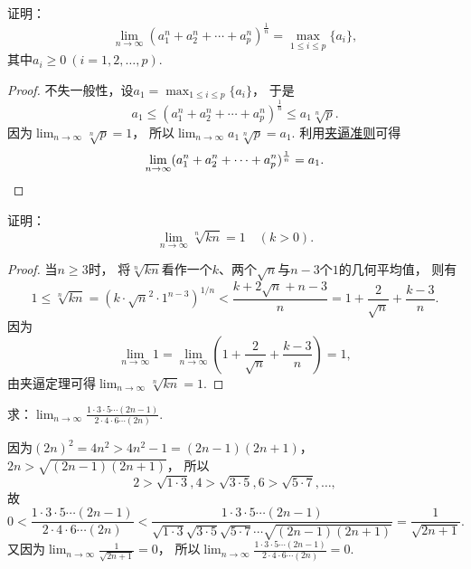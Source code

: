 \begin{example}
证明：\[
	\lim_{n\to\infty} (a_1^n + a_2^n + \dotsb + a_p^n)^{\frac1n}
	= \max_{1\leq i\leq p} \{a_i\},
\]
其中\(a_i\geq0\ (i=1,2,\dotsc,p)\).
\begin{proof}
不失一般性，设\(a_1 = \max_{1\leq i\leq p} \{a_i\}\)，
于是\[
	a_1 \leq (a_1^n + a_2^n + \dotsb + a_p^n)^{\frac1n} \leq a_1 \sqrt[n]{p}.
\]
因为\(\lim_{n\to\infty} \sqrt[n]{p} = 1\)，
所以\(\lim_{n\to\infty} a_1 \sqrt[n]{p} = a_1\).
利用\hyperref[theorem:数列极限.夹逼准则]{夹逼准则}可得\[
	\lim_{n\to\infty} (a_1^n + a_2^n + \dotsb + a_p^n)^{\frac1n} = a_1.
	\qedhere
\]
\end{proof}
\end{example}

\begin{example}
证明：\begin{equation}
	\lim_{n\to\infty} \sqrt[n]{k n} = 1
	\quad(k>0).
\end{equation}
\begin{proof}
当\(n \geq 3\)时，
将\(\sqrt[n]{k n}\)看作一个\(k\)、两个\(\sqrt{n}\)与\(n-3\)个\(1\)的几何平均值，
则有\[
	1 \leq \sqrt[n]{k n} = (k \cdot \sqrt{n}^2 \cdot 1^{n-3})^{1/n}
	< \frac{k + 2\sqrt{n} + n-3}{n}
	= 1 + \frac{2}{\sqrt{n}} + \frac{k-3}{n}.
\]
因为\[
	\lim_{n\to\infty} 1
	= \lim_{n\to\infty} \left(1 + \frac{2}{\sqrt{n}} + \frac{k-3}{n}\right) = 1,
\]
由夹逼定理可得\(\lim_{n\to\infty} \sqrt[n]{k n} = 1\).
\end{proof}
\end{example}

\begin{example}\label{example:极限.两个双阶乘的商的极限}
求：\(\lim_{n\to\infty} \frac{1 \cdot 3 \cdot 5 \dotsm (2n-1)}{2 \cdot 4 \cdot 6 \dotsm (2n)}\).
\begin{solution}
因为\((2n)^2 = 4n^2 > 4n^2-1 = (2n-1)(2n+1)\)，\(2n > \sqrt{(2n-1)(2n+1)}\)，
所以\[
	2 > \sqrt{1 \cdot 3},
	4 > \sqrt{3 \cdot 5},
	6 > \sqrt{5 \cdot 7},
	\dotsc,
\]
故\[
	0 < \frac{1 \cdot 3 \cdot 5 \dotsm (2n-1)}{2 \cdot 4 \cdot 6 \dotsm (2n)}
	< \frac{1 \cdot 3 \cdot 5 \dotsm (2n-1)}{\sqrt{1 \cdot 3} \sqrt{3 \cdot 5} \sqrt{5 \cdot 7} \dotsm \sqrt{(2n-1)(2n+1)}}
	= \frac{1}{\sqrt{2n+1}}.
\]
又因为\(\lim_{n\to\infty}\frac{1}{\sqrt{2n+1}} = 0\)，
所以\(\lim_{n\to\infty}\frac{1 \cdot 3 \cdot 5 \dotsm (2n-1)}{2 \cdot 4 \cdot 6 \dotsm (2n)} = 0\).
\end{solution}
\end{example}

